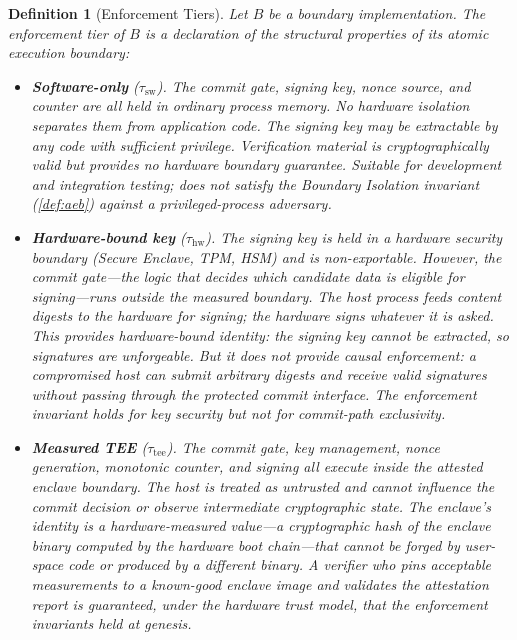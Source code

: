 \documentclass[11pt,letterpaper]{article}
\theoremstyle{occplain}
\newtheorem{definition}{Definition}[section]
\theoremstyle{occremark}
\begin{document}
\begin{definition}[Enforcement Tiers]
\label{def:enforcement-tiers}
Let $B$ be a boundary implementation. The \emph{enforcement tier} of $B$ is a declaration of the structural properties of its atomic execution boundary:
\begin{itemize}
  \item \textbf{Software-only} ($\tau_{\mathrm{sw}}$). The commit gate, signing key, nonce source, and counter are all held in ordinary process memory. No hardware isolation separates them from application code. The signing key may be extractable by any code with sufficient privilege. Verification material is cryptographically valid but provides no hardware boundary guarantee. Suitable for development and integration testing; does not satisfy the Boundary Isolation invariant (\cref{def:aeb}) against a privileged-process adversary.

  \item \textbf{Hardware-bound key} ($\tau_{\mathrm{hw}}$). The signing key is held in a hardware security boundary (Secure Enclave, TPM, HSM) and is non-exportable. However, the commit gate---the logic that decides which candidate data is eligible for signing---runs outside the measured boundary. The host process feeds content digests to the hardware for signing; the hardware signs whatever it is asked. This provides hardware-bound identity: the signing key cannot be extracted, so signatures are unforgeable. But it does not provide causal enforcement: a compromised host can submit arbitrary digests and receive valid signatures without passing through the protected commit interface. The enforcement invariant holds for key security but not for commit-path exclusivity.

  \item \textbf{Measured TEE} ($\tau_{\mathrm{tee}}$). The commit gate, key management, nonce generation, monotonic counter, and signing all execute inside the attested enclave boundary. The host is treated as untrusted and cannot influence the commit decision or observe intermediate cryptographic state. The enclave's identity is a hardware-measured value---a cryptographic hash of the enclave binary computed by the hardware boot chain---that cannot be forged by user-space code or produced by a different binary. A verifier who pins acceptable measurements to a known-good enclave image and validates the attestation report is guaranteed, under the hardware trust model, that the enforcement invariants held at genesis.
\end{itemize}
\end{definition}
\end{document}
